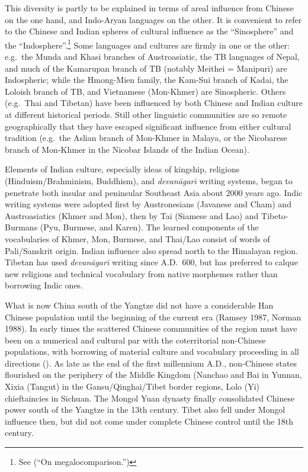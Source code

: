 This diversity is partly to be explained in terms of areal influence from Chinese on the one hand, and Indo-Aryan languages on the other. It is convenient to refer to the Chinese and Indian spheres of cultural influence as the “Sinosphere” and the “Indosphere”.\footnote{See \citealt{JAM-OM} (“On megalocomparison.”)} Some languages and cultures are firmly in one or the other: e.g.\ the Munda and Khasi branches of Austroasiatic, the TB languages of Nepal, and much of the Kamarupan branch of TB (notably Meithei = Manipuri) are Indospheric; while the Hmong-Mien family, the Kam-Sui branch of Kadai, the Loloish branch of TB, and Vietnamese (Mon-Khmer) are Sinospheric. Others (e.g.\ Thai and Tibetan) have been influenced by both Chinese and Indian culture at different historical periods. Still other linguistic communities are so remote geographically that they have escaped significant influence from either cultural tradition (e.g.\ the Aslian branch of Mon-Khmer in Malaya, or the Nicobarese branch of Mon-Khmer in the Nicobar Islands of the Indian Ocean).

Elements of Indian culture, especially ideas of kingship, religions (Hinduism/Brahminism, Buddhism), and {\it devan\=agar\={\i}} writing systems, began to penetrate both insular and peninsular Southeast Asia about 2000 years ago. Indic writing systems were adopted first by Austronesians (Javanese and Cham) and Austroasiatics (Khmer and Mon), then by Tai (Siamese and Lao) and Tibeto-Burmans (Pyu, Burmese, and Karen). The learned components of the vocabularies of Khmer, Mon, Burmese, and Thai/Lao consist of words of Pali/Sanskrit origin. Indian influence also spread north to the Himalayan region. Tibetan has used {\it devan\=agar\={\i}} writing since A.D.\ 600, but has preferred to calque new religious and technical vocabulary from native morphemes rather than borrowing Indic ones.

What is now China south of the Yangtze did not have a considerable Han Chinese population until the beginning of the current era (Ramsey 1987, Norman 1988). In early times the scattered Chinese communities of the region must have been on a numerical and cultural par with the coterritorial non-Chinese populations, with borrowing of material culture and vocabulary proceeding in all directions (\citealt{PKB-ATLC,MN-AASC,LS-CAGR}). As late as the end of the first millennium A.D., non-Chinese states flourished on the periphery of the Middle Kingdom (Nanchao and Bai in Yunnan, Xixia (Tangut) in the Gansu/Qinghai/Tibet border regions, Lolo (Yi) chieftaincies in Sichuan. The Mongol Yuan dynasty finally consolidated Chinese power south of the Yangtze in the 13th century. Tibet also fell under Mongol influence then, but did not come under complete Chinese control until the 18th century.

